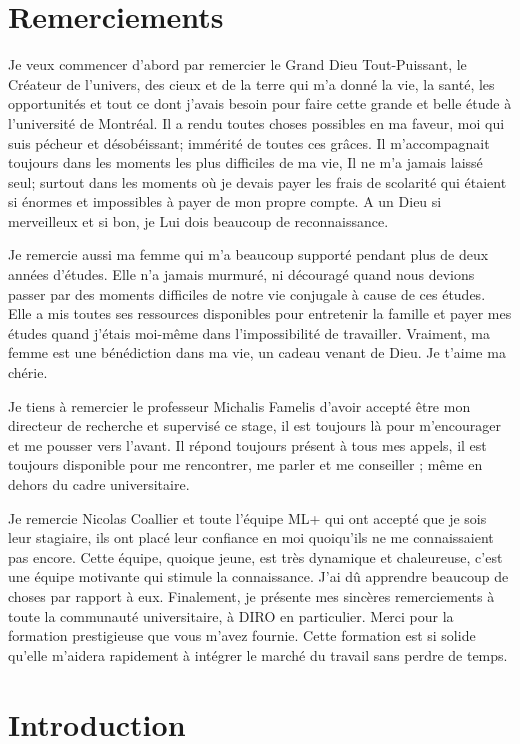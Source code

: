 \documentclass[9pt, french]{article}
\begin{document}
	\section*{Remerciements}
	Je veux commencer d'abord par remercier le Grand Dieu Tout-Puissant, le Créateur de l'univers, des cieux et de la terre qui m'a donné la vie, la santé, les opportunités et tout ce dont j'avais besoin pour faire cette grande et belle étude à l'université de Montréal. Il a rendu toutes choses possibles en ma faveur, moi qui suis pécheur et désobéissant; immérité de toutes ces grâces. Il m'accompagnait toujours dans les moments les plus difficiles de ma vie, Il ne m'a jamais laissé seul; surtout dans les moments où je devais payer les frais de scolarité qui étaient si énormes et impossibles à payer de mon propre compte. A un Dieu si merveilleux et si bon, je Lui dois beaucoup de reconnaissance.  
	
	Je remercie aussi ma femme qui m'a beaucoup supporté pendant plus de deux années d'études. Elle n'a jamais murmuré, ni découragé quand nous devions passer par des moments difficiles de notre vie conjugale à cause de ces études. Elle a mis toutes ses ressources disponibles pour entretenir la famille et payer mes études quand j’étais moi-même dans l’impossibilité de travailler. Vraiment, ma femme est une bénédiction dans ma vie, un cadeau venant de Dieu. Je t’aime ma chérie.
	
	Je tiens à remercier le professeur Michalis Famelis d’avoir accepté être mon directeur de recherche et supervisé ce stage, il est toujours là pour m’encourager et me pousser vers l’avant. Il répond toujours présent à tous mes appels, il est toujours disponible pour me rencontrer, me parler et me conseiller ; même en dehors du cadre universitaire. 
	
	Je remercie Nicolas Coallier et toute l’équipe ML+ qui ont accepté que je sois leur stagiaire, ils ont placé  leur confiance en moi quoiqu’ils ne me connaissaient pas encore. Cette équipe, quoique jeune, est très dynamique et chaleureuse, c’est une équipe motivante qui stimule la connaissance. J’ai dû apprendre beaucoup de choses par rapport à eux.
	Finalement, je présente mes sincères remerciements à toute la communauté universitaire, à DIRO en particulier. Merci pour la formation prestigieuse que vous m’avez fournie. Cette formation est si solide qu’elle m’aidera rapidement à intégrer le marché du travail sans perdre de temps. 
	
	\newpage
	

	\section{Introduction}
	
\end{document}
